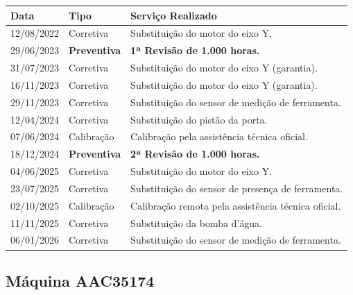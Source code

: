 \documentclass[12pt, a4paper]{article}
\begin{document}
\begin{table}[H]
    \centering
    \small
    \renewcommand{\arraystretch}{1.3}
    \begin{tabularx}{\textwidth}{@{} p{2cm} p{2.8cm} X @{}}
        \toprule
        \rowcolor{tableHeader} \textbf{Data} & \textbf{Tipo} & \textbf{Serviço Realizado} \\
        \midrule
        12/08/2022 & Corretiva & Substituição do motor do eixo Y. \\
        \rowcolor{lightGray}
        29/06/2023 & \textcolor{successGreen}{\textbf{Preventiva}} & \textbf{1ª Revisão de 1.000 horas.} \\
        31/07/2023 & Corretiva & Substituição do motor do eixo Y (garantia). \\
        \rowcolor{lightGray}
        16/11/2023 & Corretiva & Substituição do motor do eixo Y (garantia). \\
        29/11/2023 & Corretiva & Substituição do sensor de medição de ferramenta. \\
        \rowcolor{lightGray}
        12/04/2024 & Corretiva & Substituição do pistão da porta. \\
        07/06/2024 & Calibração & Calibração pela assistência técnica oficial. \\
        \rowcolor{lightGray}
        18/12/2024 & \textcolor{successGreen}{\textbf{Preventiva}} & \textbf{2ª Revisão de 1.000 horas.} \\
        04/06/2025 & Corretiva & Substituição do motor do eixo Y. \\
        \rowcolor{lightGray}
        23/07/2025 & Corretiva & Substituição do sensor de presença de ferramenta. \\
        02/10/2025 & Calibração & Calibração remota pela assistência técnica oficial. \\
        \rowcolor{lightGray}
        11/11/2025 & Corretiva & Substituição da bomba d'água. \\
        06/01/2026 & Corretiva & Substituição do sensor de medição de ferramenta. \\
        \bottomrule
    \end{tabularx}
\end{table}

\subsection{Máquina AAC35174}
\end{document}
